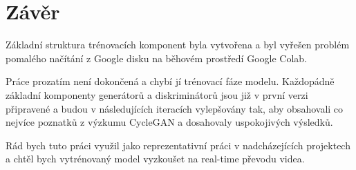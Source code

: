 \documentclass[czech]{mvi-report}
\begin{document}
\section{Závěr}

Základní struktura trénovacích komponent byla vytvořena a byl vyřešen problém pomalého načítání z Google disku na běhovém prostředí Google Colab.

Práce prozatím není dokončená a chybí jí trénovací fáze modelu. Každopádně základní komponenty generátorů a diskriminátorů jsou již v první verzi připravené a budou v následujících iteracích vylepšovány tak, aby obsahovali co nejvíce poznatků z výzkumu CycleGAN a dosahovaly uspokojivých výsledků.

Rád bych tuto práci využil jako reprezentativní práci v nadcházejících projektech a chtěl bych vytrénovaný model vyzkoušet na real-time převodu videa. 


%

\end{document}
